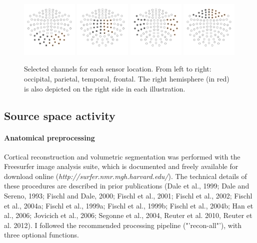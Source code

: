 \begin{figure}[h]
\begin{center}
\vspace{7mm}
\includegraphics[width=0.24\textwidth]{pics/3_3_occipital_sensors}
\includegraphics[width=0.24\textwidth]{pics/3_3_parietal_sensors}
\includegraphics[width=0.24\textwidth]{pics/3_3_temporal_sensors}
\includegraphics[width=0.24\textwidth]{pics/3_3_frontal_sensors}
\caption{\label{3.3.sensors} Selected channels for each sensor location. From left to right: occipital, parietal, temporal, frontal. The right hemisphere (in red) is also depicted on the right side in each illustration.}
\end{center}
\end{figure}

\subsection{Source space activity}

\paragraph{Anatomical preprocessing}
Cortical reconstruction and volumetric segmentation was performed with the Freesurfer image analysis suite, which is documented and freely available for download online (\emph{http://surfer.nmr.mgh.harvard.edu/}).
The technical details of these procedures are described in prior publications (Dale et al., 1999; Dale and Sereno, 1993; Fischl and Dale, 2000; Fischl et al., 2001; Fischl et al., 2002; Fischl et al., 2004a; Fischl et al., 1999a; Fischl et al., 1999b; Fischl et al., 2004b; Han et al., 2006; Jovicich et al., 2006; Segonne et al., 2004, Reuter et al. 2010, Reuter et al. 2012).
I followed the recommended processing pipeline ("'recon-all"'), with three optional functions.

